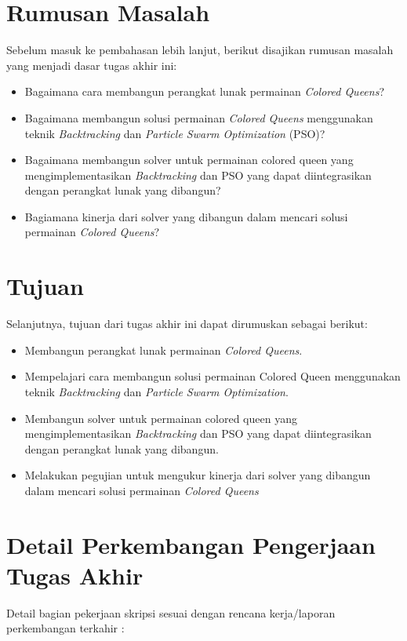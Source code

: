 \documentclass[a4paper,twoside]{article}
\begin{document}
	
	\section{Rumusan Masalah}
	Sebelum masuk ke pembahasan lebih lanjut, berikut disajikan rumusan masalah yang menjadi dasar tugas akhir ini:
	\begin{itemize}	
		\item Bagaimana cara membangun perangkat lunak permainan \textit{Colored Queens}?
		\item Bagaimana membangun solusi permainan \textit{Colored Queens} menggunakan teknik \textit{Backtracking} dan \textit{Particle Swarm Optimization} (PSO)?
		\item Bagaimana membangun solver untuk permainan colored queen yang mengimplementasikan \textit{Backtracking} dan PSO yang dapat diintegrasikan dengan perangkat lunak yang dibangun?
		\item Bagiamana kinerja dari solver yang dibangun dalam mencari solusi permainan \textit{Colored Queens}?
	\end{itemize}
	
	\section{Tujuan}
	Selanjutnya, tujuan dari tugas akhir ini dapat dirumuskan sebagai berikut:
	\begin{itemize}	
		\item Membangun perangkat lunak permainan \textit{Colored Queens}.
		\item Mempelajari cara membangun solusi permainan Colored Queen menggunakan teknik \textit{Backtracking} dan \textit{Particle Swarm Optimization}.
		\item Membangun solver untuk permainan colored queen yang mengimplementasikan \textit{Backtracking} dan PSO yang dapat diintegrasikan dengan perangkat lunak yang dibangun.
		\item Melakukan pegujian untuk mengukur kinerja dari solver yang dibangun dalam mencari solusi permainan \textit{Colored Queens}
	\end{itemize}
	
	\section{Detail Perkembangan Pengerjaan Tugas Akhir}
	Detail bagian pekerjaan skripsi sesuai dengan rencana kerja/laporan perkembangan terkahir :
\end{document}
